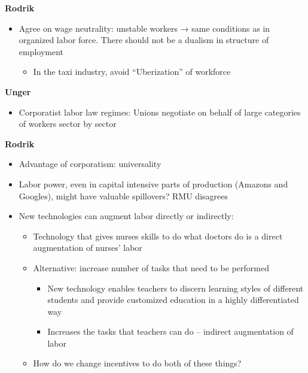 \textbf{Rodrik}

\begin{itemize}
\tightlist
\item
  Agree on wage neutrality: unstable workers → same conditions as in
  organized labor force. There should not be a dualism in structure of
  employment

  \begin{itemize}
  \tightlist
  \item
    In the taxi industry, avoid ``Uberization'' of workforce
  \end{itemize}
\end{itemize}

\textbf{Unger}

\begin{itemize}
\tightlist
\item
  Corporatist labor law regimes: Unions negotiate on behalf of large
  categories of workers sector by sector
\end{itemize}

\textbf{Rodrik}

\begin{itemize}
\tightlist
\item
  Advantage of corporatism: universality
\item
  Labor power, even in capital intensive parts of production (Amazons
  and Googles), might have valuable spillovers? RMU disagrees
\item
  New technologies can augment labor directly or indirectly:

  \begin{itemize}
  \tightlist
  \item
    Technology that gives nurses skills to do what doctors do is a
    direct augmentation of nurses' labor
  \item
    Alternative: increase number of tasks that need to be performed

    \begin{itemize}
    \tightlist
    \item
      New technology enables teachers to discern learning styles of
      different students and provide customized education in a highly
      differentiated way
    \item
      Increases the tasks that teachers can do -- indirect augmentation
      of labor
    \end{itemize}
  \item
    How do we change incentives to do both of these things?
  \end{itemize}
\end{itemize}

